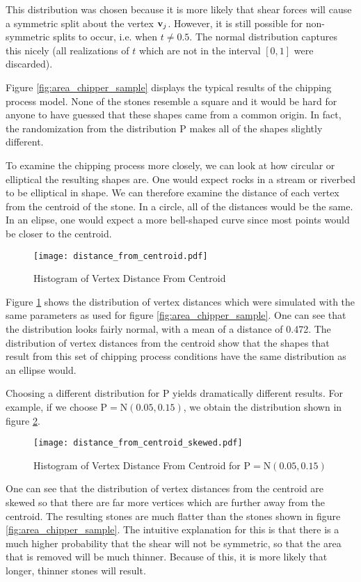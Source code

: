 This distribution was chosen because it is more likely that shear forces will cause a symmetric split about the vertex $\mathbf{v}_j$. However, it is still possible for non-symmetric splits to occur, i.e. when $t \neq 0.5$. The normal distribution captures this nicely (all realizations of $t$ which are not in the interval $[0,1]$ were discarded).

Figure \ref{fig:area_chipper_sample} displays the typical results of the chipping process model. None of the stones resemble a square and it would be hard for anyone to have guessed that these shapes came from a common origin. In fact, the randomization from the distribution $\mathrm{P}$ makes all of the shapes slightly different.

To examine the chipping process more closely, we can look at how circular or elliptical the resulting shapes are. One would expect rocks in a stream or riverbed to be elliptical in shape. We can therefore examine the distance of each vertex from the centroid of the stone. In a circle, all of the distances would be the same. In an elipse, one would expect a more bell-shaped curve since most points would be closer to the centroid.

\begin{figure}
  \begin{center}
    \texttt{[image: distance\_from\_centroid.pdf]}
  \end{center}
  \caption{Histogram of Vertex Distance From Centroid \label{fig:distance_from_centroid}}
\end{figure}

Figure \ref{fig:distance_from_centroid} shows the distribution of vertex distances which were simulated with the same parameters as used for figure \ref{fig:area_chipper_sample}. One can see that the distribution looks fairly normal, with a mean of a distance of 0.472. The distribution of vertex distances from the centroid show that the shapes that result from this set of chipping process conditions have the same distribution as an ellipse would.

Choosing a different distribution for $\mathrm{P}$ yields dramatically different results. For example, if we choose $\mathrm{P} = \mathrm{N}(0.05, 0.15)$, we obtain the distribution shown in figure \ref{fig:distance_from_centroid_skewed}.

\begin{figure}
  \begin{center}
    \texttt{[image: distance\_from\_centroid\_skewed.pdf]}
  \end{center}
  \caption{Histogram of Vertex Distance From Centroid for $\mathrm{P} = \mathrm{N}(0.05, 0.15)$ \label{fig:distance_from_centroid_skewed}}
\end{figure}

One can see that the distribution of vertex distances from the centroid are skewed so that there are far more vertices which are further away from the centroid. The resulting stones are much flatter than the stones shown in figure \ref{fig:area_chipper_sample}. The intuitive explanation for this is that there is a much higher probability that the shear will not be symmetric, so that the area that is removed will be much thinner. Because of this, it is more likely that longer, thinner stones will result.
